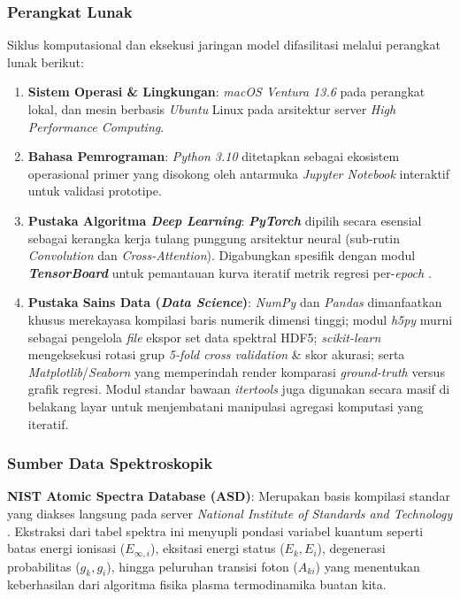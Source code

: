 \documentclass[12pt, a4paper]{article}
\begin{document}
\subsubsection{Perangkat Lunak}
Siklus komputasional dan eksekusi jaringan model difasilitasi melalui perangkat lunak berikut:
\begin{enumerate}
    \item \textbf{Sistem Operasi \& Lingkungan}: \textit{macOS Ventura 13.6} pada perangkat lokal, dan mesin berbasis \textit{Ubuntu} Linux pada arsitektur server \textit{High Performance Computing}.
    \item \textbf{Bahasa Pemrograman}: \textit{Python 3.10} ditetapkan sebagai ekosistem operasional primer yang disokong oleh antarmuka \textit{Jupyter Notebook} interaktif untuk validasi prototipe.
    \item \textbf{Pustaka Algoritma \textit{Deep Learning}}: \textbf{\textit{PyTorch}} dipilih secara esensial sebagai kerangka kerja tulang punggung arsitektur neural (sub-rutin \textit{Convolution} dan \textit{Cross-Attention}). Digabungkan spesifik dengan modul \textbf{\textit{TensorBoard}} untuk pemantauan kurva iteratif metrik regresi per-\textit{epoch} \citep{paszke2019}.
    \item \textbf{Pustaka Sains Data (\textit{Data Science})}: \textit{NumPy} dan \textit{Pandas} dimanfaatkan khusus merekayasa kompilasi baris numerik dimensi tinggi; modul \textit{h5py} murni sebagai pengelola \textit{file} ekspor set data spektral HDF5; \textit{scikit-learn} mengeksekusi rotasi grup \textit{5-fold cross validation} \& skor akurasi; serta \textit{Matplotlib}/\textit{Seaborn} yang memperindah render komparasi \textit{ground-truth} versus grafik regresi. Modul standar bawaan \textit{itertools} juga digunakan secara masif di belakang layar untuk menjembatani manipulasi agregasi komputasi yang iteratif.
\end{enumerate}

\subsubsection{Sumber Data Spektroskopik}
\textbf{NIST Atomic Spectra Database (ASD)}: Merupakan basis kompilasi standar yang diakses langsung pada server \textit{National Institute of Standards and Technology} \citep{kramida2024}. Ekstraksi dari tabel spektra ini menyupli pondasi variabel kuantum seperti batas energi ionisasi ($E_{\infty,i}$), eksitasi energi status ($E_k, E_i$), degenerasi probabilitas ($g_k, g_i$), hingga peluruhan transisi foton ($A_{ki}$) yang menentukan keberhasilan dari algoritma fisika plasma termodinamika buatan kita.
\end{document}
